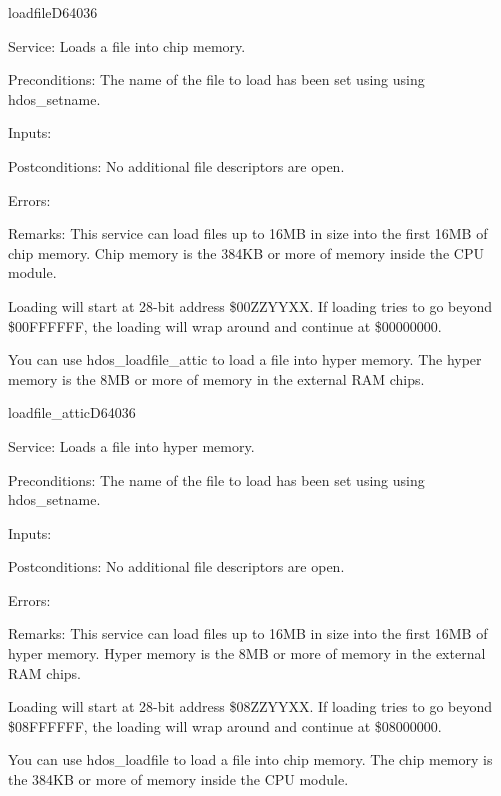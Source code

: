 \newpage
\begin{hyppotrap}{loadfile}{D640}{36}
\item [Service:]
  Loads a file into chip memory.
\item [Preconditions:]
  The name of the file to load has been set using using hdos\_setname.
\item [Inputs:]
\item [Postconditions:]
  No additional file descriptors are open.
\item [Errors:]
\item [Remarks:]
  This service can load files up to 16MB in size into the first 16MB of chip
  memory. Chip memory is the 384KB or more of memory inside the CPU module.

  Loading will start at 28-bit address \$00ZZYYXX. If loading tries to go beyond
  \$00FFFFFF, the loading will wrap around and continue at \$00000000.

  You can use hdos\_loadfile\_attic to load a file into hyper memory. The hyper
  memory is the 8MB or more of memory in the external RAM chips.
\end{hyppotrap}


\newpage
\begin{hyppotrap}{loadfile\_attic}{D640}{36}
\item [Service:]
  Loads a file into hyper memory.
\item [Preconditions:]
  The name of the file to load has been set using using hdos\_setname.
\item [Inputs:]
\item [Postconditions:]
  No additional file descriptors are open.
\item [Errors:]
\item [Remarks:]
  This service can load files up to 16MB in size into the first 16MB of hyper
  memory. Hyper memory is the 8MB or more of memory in the external RAM chips.

  Loading will start at 28-bit address \$08ZZYYXX. If loading tries to go beyond
  \$08FFFFFF, the loading will wrap around and continue at \$08000000.

  You can use hdos\_loadfile to load a file into chip memory. The chip memory is
  the 384KB or more of memory inside the CPU module.
\end{hyppotrap}


